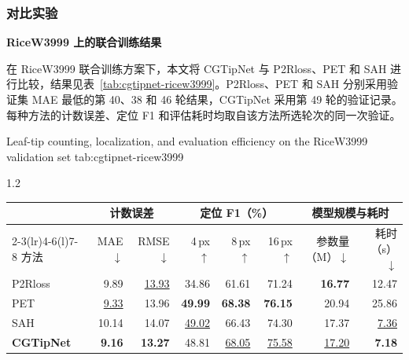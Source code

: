 \subsubsection{对比实验}
\label{sec:cgtipnet-comparison}
\medskip\noindent\textbf{RiceW3999 上的联合训练结果}\par
在 RiceW3999 联合训练方案下，本文将 CGTipNet 与 P2Rloss、PET 和 SAH 进行比较，结果见表~\ref{tab:cgtipnet-ricew3999}。P2Rloss、PET 和 SAH 分别采用验证集 MAE 最低的第 40、38 和 46 轮结果，CGTipNet 采用第 49 轮的验证记录。每种方法的计数误差、定位 F1 和评估耗时均取自该方法所选轮次的同一次验证。
\begin{table}[H]
  \centering
    {Leaf-tip counting, localization, and evaluation efficiency on the RiceW3999 validation set}
    {tab:cgtipnet-ricew3999}
  \begin{spacing}{1.2}
    \normalfont{}
    \setlength{\tabcolsep}{4pt}
    \renewcommand{\arraystretch}{1.15}
    \begin{tabular*}{\linewidth}{@{\extracolsep{\fill}}lrrrrrrr@{}}
      \toprule
      & \multicolumn{2}{c}{计数误差}
      & \multicolumn{3}{c}{定位 F1（\%）}
      & \multicolumn{2}{c}{模型规模与耗时} \\
      \cmidrule(lr){2-3}\cmidrule(lr){4-6}\cmidrule(l){7-8}
      方法 & MAE\(\downarrow\) & RMSE\(\downarrow\)
        & 4\,px\(\uparrow\) & 8\,px\(\uparrow\) & 16\,px\(\uparrow\)
        & 参数量（M）\(\downarrow\) & 耗时（s）\(\downarrow\) \\
      \midrule
      P2Rloss & 9.89 & \underline{13.93}
        & 34.86 & 61.61 & 71.24 & \textbf{16.77} & 12.47 \\
      PET & \underline{9.33} & 13.96
        & \textbf{49.99} & \textbf{68.38} & \textbf{76.15} & 20.94 & 25.86 \\
      SAH & 10.14 & 14.07
        & \underline{49.02} & 66.43 & 74.30 & 17.37 & \underline{7.36} \\
      \midrule
      \textbf{CGTipNet} & \textbf{9.16} & \textbf{13.27}
        & 48.81 & \underline{68.05} & \underline{75.58}
        & \underline{17.20} & \textbf{7.18} \\
      \bottomrule
    \end{tabular*}
  \end{spacing}
  \par\vspace{8pt}
  \noindent\begin{minipage}{\linewidth}

\end{minipage}
\end{table}
